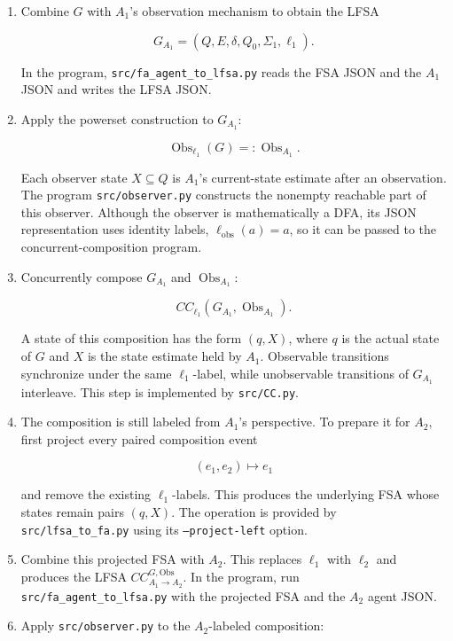 \documentclass[11pt]{article}
\begin{document}
\begin{enumerate}
\item Combine $G$ with $A_1$'s observation mechanism to obtain the
LFSA

\[
   G_{A_1}=(Q,E,\delta,Q_0,\Sigma_1,\ell_1).
\]

In the program, \texttt{src/fa\_agent\_to\_lfsa.py} reads the FSA JSON and the
$A_1$ JSON and writes the LFSA JSON.

\item Apply the powerset construction to $G_{A_1}$:

\[
   \operatorname{Obs}_{\ell_1}(G)
   =:\operatorname{Obs}_{A_1}.
\]

Each observer state $X\subseteq Q$ is $A_1$'s current-state
estimate after an observation. The program \texttt{src/observer.py}
constructs the nonempty reachable part of this observer. Although
the observer is mathematically a DFA, its JSON representation uses
identity labels, $\ell_{\mathrm{obs}}(a)=a$, so it can be passed
to the concurrent-composition program.

\item Concurrently compose $G_{A_1}$ and
$\operatorname{Obs}_{A_1}$:

\[
   CC_{\ell_1}
   \left(G_{A_1},\operatorname{Obs}_{A_1}\right).
\]

A state of this composition has the form $(q,X)$, where $q$ is
the actual state of $G$ and $X$ is the state estimate held by
$A_1$. Observable transitions synchronize under the same
$\ell_1$-label, while unobservable transitions of $G_{A_1}$
interleave. This step is implemented by \texttt{src/CC.py}.

\item The composition is still labeled from $A_1$'s perspective. To
prepare it for $A_2$, first project every paired composition event

\[
   (e_1,e_2)\longmapsto e_1
\]

and remove the existing $\ell_1$-labels. This produces the
underlying FSA whose states remain pairs $(q,X)$. The operation is
provided by \texttt{src/lfsa\_to\_fa.py} using its \texttt{--project-left} option.

\item Combine this projected FSA with $A_2$. This replaces
$\ell_1$ with $\ell_2$ and produces the LFSA
$CC^{G,\mathrm{Obs}}_{A_1\rightarrow A_2}$. In the program, run
\texttt{src/fa\_agent\_to\_lfsa.py} with the projected FSA and the $A_2$
agent JSON.

\item Apply \texttt{src/observer.py} to the $A_2$-labeled composition:


\end{enumerate}
\end{document}
